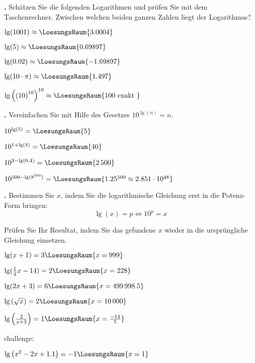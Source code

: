 \newpage

\textbf{\bbwAufgabenNummer{}.}
Schätzen Sie die folgenden Logarithmen und prüfen Sie mit dem
Taschenrechner. Zwischen welchen beiden ganzen Zahlen liegt der Logarithmus?


\begin{bbwAufgabenBlock}
\item $\lg(1001) \approx  \LoesungsRaum{3.0004}$
\item $\lg(5) \approx  \LoesungsRaum{0.69897}$
\item $\lg(0.02) \approx  \LoesungsRaum{-1.69897}$
\item $\lg(10\cdot{}\pi) \approx  \LoesungsRaum{1.497}$
\item $\lg\left(\left(10\right)^{10}\right)^{10} \approx  \LoesungsRaum{100 \text{ exakt }}$

\end{bbwAufgabenBlock}
\newpage

\textbf{\bbwAufgabenNummer{}.}
Vereinfachen Sie mit Hilfe des Gesetzes $10^{\lg(n)} = n$.


\begin{bbwAufgabenBlock}
\item $10^{\lg(5)} =  \LoesungsRaum{5}$
\item $10^{1+\lg(4)} =  \LoesungsRaum{40}$
\item $10^{3-\lg(0.4)} =  \LoesungsRaum{2\,500}$
\item $10^{500-\lg(8^{500})} = \LoesungsRaum{1.25^{500} \approx 2.851\cdot{}10^{48}}$
\end{bbwAufgabenBlock}


\newpage

\textbf{\bbwAufgabenNummer{}.}
Bestimmen Sie $x$, indem Sie die logarithmische Gleichung erst in die
Potenz-Form bringen:
$$\lg(x) = p \Longleftrightarrow 10^p = x$$

Prüfen Sie Ihr Resultat, indem Sie das gefundene $x$ wieder in die
ursprüngliche Gleichung einsetzen.

\begin{bbwAufgabenBlock}
\item $\lg(x+1)= 3  \LoesungsRaum{x=999}$
\item $\lg(\frac12 x - 14)= 2  \LoesungsRaum{x=228}$
\item $\lg(2x+3)= 6  \LoesungsRaum{x=499\,998.5}$
\item $\lg\left(\sqrt{x}\right)= 2  \LoesungsRaum{x=10\,000}$
\item $\lg\left(\frac2{x+3}\right)=
1  \LoesungsRaum{x=\frac{-14}5}$

challenge:
\item $\lg\left( x^2-2x+1.1 \right)= -1  \LoesungsRaum{x=1}$

\end{bbwAufgabenBlock}

